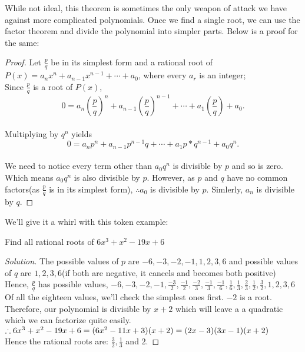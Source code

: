 While not ideal, this theorem is sometimes the only weapon of attack we have against more complicated polynomials. Once we find a single root, we can use the factor theorem and divide the polynomial into simpler parts. Below is a proof for the same:\\
\begin{proof}
    Let $\frac{p}{q}$ be in its simplest form and a rational root of $P(x) = a_n x^n + a_{n-1} x^{n-1} + \cdots + a_0$, where every $a_r$ is an integer; \\
    Since $\frac{p}{q}$ is a root of $P(x)$,
    \[0 = a_n \left(\frac{p}{q}\right)^n + a_{n-1} \left(\frac{p}{q}\right)^{n-1} + \cdots + a_1 \left(\frac{p}{q}\right) + a_0.\]\\
    Multiplying by $q^n$ yields
    \[0 = a_n p^n + a_{n-1} p^{n-1} q + \cdots + a_1 p * q^{n-1} + a_0 q^n.\]\\
    We need to notice every term other than $a_0 q^n$ is divisible by $p$ and so is zero. Which means $a_0 q^n$ is also divisible by $p$. However, as $p$ and $q$ have no common factors(as $\frac{p}{q}$ is in its simplest form), $\therefore a_0$ is divisible by $p$. Simlerly, $a_n$ is divisible by $q$.
\end{proof}
We'll give it a whirl with this token example:\\
\begin{example}
    Find all rational roots of $6x^3 + x^2 - 19x + 6$
\end{example}
\begin{proof}
    [Solution]
    The possible values of $p$ are $-6,-3,-2,-1,1,2,3,6$ and possible values of $q$ are $1,2,3,6$(if both are negative, it cancels and becomes both positive)\\
    Hence, $\frac{p}{q}$ has possible values, $-6,-3,-2,-1,\frac{-3}{2}, \frac{-1}{2}, \frac{-2}{3}, \frac{-1}{3}, \frac{-1}{6}, \frac{1}{6}, \frac{1}{3}, \frac{2}{3}, \frac{1}{2}, \frac{3}{2}, 1, 2, 3, 6$\\
    Of all the eighteen values, we'll check the simplest ones first. $-2$ is a root. Therefore, our polynomial is divisible by $x+2$ which will leave a a quadratic which we can factorize quite easily.\\
    $\therefore 6x^3+x^2-19x+6=(6x^2-11x+3)(x+2)\\
    =(2x-3)(3x-1)(x+2)$\\
    Hence the rational roots are: $\frac{3}{2}, \frac{1}{3}$ and $2$.
\end{proof}
